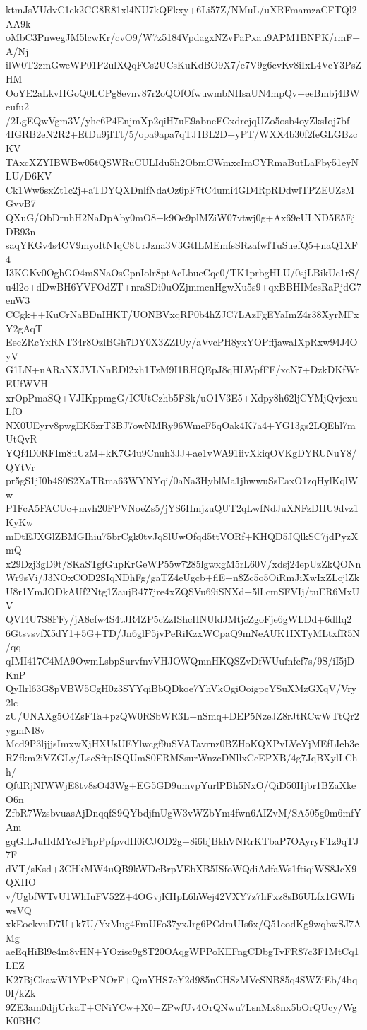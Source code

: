 ktmJsVUdvC1ek2CG8R81xl4NU7kQFkxy+6Li57Z/NMuL/uXRFmamzaCFTQl2AA9k
oMbC3PnwegJM5lcwKr/cvO9/W7z5184VpdagxNZvPaPxau9APM1BNPK/rmF+A/Nj
ilW0T2zmGweWP01P2ulXQqFCs2UCsKuKdBO9X7/e7V9g6cvKv8iIxL4VcY3PsZHM
OoYE2aLkvHGoQ0LCPg8evnv87r2oQOfOfwuwmbNHsaUN4mpQv+eeBmbj4BWeufu2
/2LgEQwVgm3V/yhe6P4EnjmXp2qiH7uE9abneFCxdrejqUZo5osb4oyZksIoj7bf
4IGRB2eN2R2+EtDu9jITt/5/opa9apa7qTJ1BL2D+yPT/WXX4b30f2feGLGBzcKV
TAxcXZYIBWBw05tQSWRuCULIdu5h2ObmCWmxcImCYRmaButLaFby51eyNLU/D6KV
Ck1Ww6sxZt1c2j+aTDYQXDnlfNdaOz6pF7tC4umi4GD4RpRDdwlTPZEUZsMGvvB7
QXuG/ObDruhH2NaDpAby0mO8+k9Oe9plMZiW07vtwj0g+Ax69eULND5E5EjDB93n
saqYKGv4s4CV9myoItNIqC8UrJzna3V3GtILMEmfsSRzafwfTuSuefQ5+naQ1XF4
I3KGKv0OghGO4mSNaOsCpnIolr8ptAcLbueCqc0/TK1prbgHLU/0sjLBikUc1rS/
u4l2o+dDwBH6YVFOdZT+nraSDi0uOZjmmcnHgwXu5s9+qxBBHIMcsRaPjdG7enW3
CCgk++KuCrNaBDnIHKT/UONBVxqRP0b4hZJC7LAzFgEYaImZ4r38XyrMFxY2gAqT
EecZRcYxRNT34r8OzlBGh7DY0X3ZZIUy/aVvcPH8yxYOPffjawaIXpRxw94J4OyV
G1LN+nARaNXJVLNnRDl2xh1TzM9I1RHQEpJ8qHLWpfFF/xcN7+DzkDKfWrEUfWVH
xrOpPmaSQ+VJIKppmgG/ICUtCzhb5FSk/uO1V3E5+Xdpy8h62ljCYMjQvjexuLfO
NX0UEyrv8pwgEK5zrT3BJ7owNMRy96WmeF5qOak4K7a4+YG13gs2LQEhl7mUtQvR
YQf4D0RFIm8uUzM+kK7G4u9Cnuh3JJ+ae1vWA91iivXkiqOVKgDYRUNuY8/QYtVr
pr5gS1jI0h4S0S2XaTRma63WYNYqi/0aNa3HyblMa1jhwwuSsEaxO1zqHylKqlWw
P1FcA5FACUc+mvh20FPVNoeZs5/jYS6HmjzuQUT2qLwfNdJuXNFzDHU9dvz1KyKw
mDtEJXGlZBMGIhiu75brCgk0tvJqSlUwOfqd5ttVORf+KHQD5JQlkSC7jdPyzXmQ
x29Dzj3gD9t/SKaSTgfGupKrGeWP55w7285lgwxgM5rL60V/xdsj24epUzZkQONn
Wr9sVi/J3NOxCOD2SIqNDhFg/gaTZ4eUgcb+flE+n8Zc5o5OiRmJiXwIxZLcjlZk
U8r1YmJODkAUf2Ntg1ZaujR477jre4xZQSVu69iSNXd+5lLcmSFVIj/tuER6MxUV
QVI4U7S8FFy/jA8cfw4S4tJR4ZP5cZzIShcHNUldJMtjcZgoFje6gWLDd+6dlIq2
6GtsvsvfX5dY1+5G+TD/Jn6glP5jvPeRiKzxWCpaQ9mNeAUK1IXTyMLtxfR5N/qq
qIMI417C4MA9OwmLsbpSurvfnvVHJOWQmnHKQSZvDfWUufnfcf7s/9S/iI5jDKnP
QyIlrl63G8pVBW5CgH0z3SYYqiBbQDkoe7YhVkOgiOoigpcYSuXMzGXqV/Vry2lc
zU/UNAXg5O4ZsFTa+pzQW0RSbWR3L+nSmq+DEP5NzeJZ8rJtRCwWTtQr2ygmNI8v
Mcd9P3ljjjsImxwXjHXUsUEYlwcgf9uSVATavrnz0BZHoKQXPvLVeYjMEfLIeh3e
RZfkm2iVZGLy/LscSftpISQUmS0ERMSsurWnzcDNllxCcEPXB/4g7JqBXylLChh/
QftlRjNIWWjE8tv8sO43Wg+EG5GD9umvpYurlPBh5NxO/QiD50Hjbr1BZaXkeO6n
ZfbR7WzsbvuasAjDnqqfS9QYbdjfnUgW3vWZbYm4fwn6AIZvM/SA505g0m6mfYAm
gqGlLJuHdMYeJFhpPpfpvdH0iCJOD2g+8i6bjBkhVNRrKTbaP7OAyryFTz9qTJ7F
dVT/sKsd+3CHkMW4uQB9kWDcBrpVEbXB5ISfoWQdiAdfaWs1ftiqiWS8JcX9QXHO
v/UgbfWTvU1WhIuFV52Z+4OGvjKHpL6hWej42VXY7z7hFxz8sB6ULfx1GWIiwsVQ
xkEoekvuD7U+k7U/YxMug4FmUFo37yxJrg6PCdmUIs6x/Q51codKg9wqbwSJ7AMg
aeEqHiBl9e4m8vHN+YOzisc9g8T20OAqgWPPoKEFngCDbgTvFR87c3F1MtCq1LEZ
K27BjCkawW1YPxPNOrF+QmYHS7eY2d985nCHSzMVeSNB85q4SWZiEb/4bq0I/kZk
9ZE3am0djjUrkaT+CNiYCw+X0+ZPwfUv4OrQNwu7LsnMx8nx5bOrQUcy/WgK0BHC
